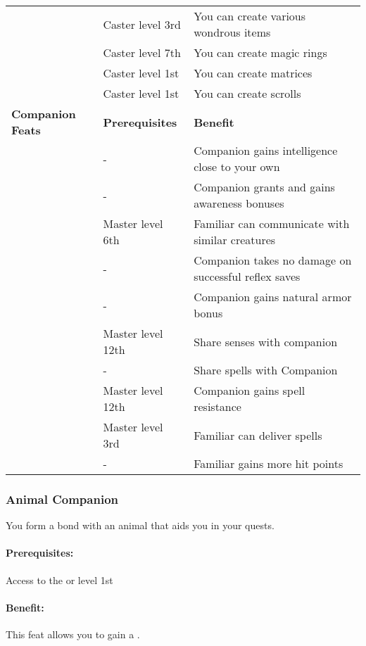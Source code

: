 \begin{table*}
{{\begin{tabular}{|p{}|p{}|p{}|}
\nameref{Feat:CraftWondrousItem}&Caster level 3rd&You can create various wondrous items\\
\nameref{Feat:ForgeRing}&Caster level 7th&You can create magic rings\\
\nameref{Feat:ImbueMatrix}&Caster level 1st&You can create matrices\\
\nameref{Feat:ScribeScroll}&Caster level 1st&You can create scrolls\\
\hline
\textbf{Companion Feats}&\textbf{Prerequisites}&\textbf{Benefit}\\
\hline
\nameref{Feat:CerebralCompanion}&-&Companion gains intelligence close to your own\\
\nameref{Feat:CompanionAlertness}&-&Companion grants and gains awareness bonuses\\
\nameref{Feat:CompanionCommunication}&Master level 6th&Familiar can communicate with similar creatures\\
\nameref{Feat:CompanionEvasion}&-&Companion takes no damage on successful reflex saves\\
\nameref{Feat:CompanionHardiness}&-&Companion gains natural armor bonus\\
\nameref{Feat:CompanionSightLink}&Master level 12th&Share senses with companion\\
\nameref{Feat:CompanionSpellLink}&-&Share spells with Companion\\
\nameref{Feat:CompanionSpellResistance}&Master level 12th&Companion gains spell resistance\\
\nameref{Feat:FamiliarSpellDelivery}&Master level 3rd&Familiar can deliver spells\\
\nameref{Feat:FamiliarToughness}&-&Familiar gains more hit points\\
\hline
\end{tabular}}}
\end{table*}
\subsubsection{Animal Companion}
\label{Feat:AnimalCompanion}
You form a bond with an animal that aids you in your quests.

\paragraph{Prerequisites:} Access to the  or  level 1st

\paragraph{Benefit:} This feat allows you to gain a .

